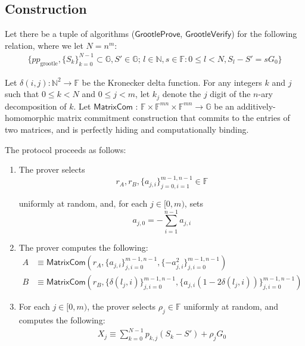 \begin{appendices}
\subsection{Construction}
\label{appendix:grootle-proof-construction}

Let there be a tuple of algorithms ($\mathsf{GrootleProve}$, $\mathsf{GrootleVerify}$) for the following relation, where we let $N = n^m$:\vspace{.115cm}
\begin{align*}
    \{pp_{\textrm{grootle}}, \{S_k\}^{N-1}_{k=0} \subset \mathbb{G}, S' \in \mathbb{G}\textrm{; } l \in \mathbb{N}, s \in \mathbb{F} : 0 \leq l < N, S_l - S' = s G_0 \}
\end{align*}

Let $\delta(i,j) : \mathbb{N}^2 \xrightarrow{} \mathbb{F}$ be the Kronecker delta function. For any integers $k$ and $j$ such that $0 \leq k < N$ and $0 \leq j < m$, let $k_j$ denote the $j$ digit of the $n$-ary decomposition of $k$. Let $\mathsf{MatrixCom}$ : $\mathbb{F} \times \mathbb{F}^{mn} \times \mathbb{F}^{mn} \xrightarrow{} \mathbb{G}$ be an additively-homomorphic matrix commitment construction that commits to the entries of two matrices, and is perfectly hiding and computationally binding.

The protocol proceeds as follows:

\begin{enumerate}
    \item The prover selects
    \[r_A, r_B, \{a_{j,i}\}^{m-1,n-1}_{j=0,i=1} \in \mathbb{F}\]

    uniformly at random, and, for each $j \in [0,m)$, sets\vspace{.115cm}
    \[a_{j,0} = - \sum^{n-1}_{i=1} a_{j,i}\]

    \item The prover computes the following:\vspace{.115cm}
    \begin{align*}
        A &\equiv \mathsf{MatrixCom} \left(r_A, \{a_{j,i}\}^{m-1,n-1}_{j,i=0}, \{-a^2_{j,i}\}^{m-1,n-1}_{j,i=0}\right) \\
        B &\equiv \mathsf{MatrixCom} \left(r_B, \{\delta(l_{j},i)\}^{m-1,n-1}_{j,i=0}, \{a_{j,i}(1-2\delta(l_j,i))\}^{m-1,n-1}_{j,i=0}\right)
    \end{align*}

    \item For each $j \in [0,m)$, the prover selects $\rho_j \in \mathbb{F}$ uniformly at random, and computes the following:\vspace{.115cm}
    \begin{align*}
        X_j \equiv \sum^{N-1}_{k=0} p_{k,j}(S_k - S') + \rho_j G_0
    \end{align*}


\end{enumerate}
\end{appendices}
